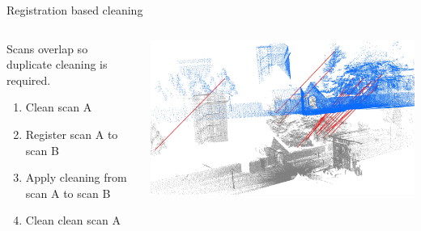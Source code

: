 \documentclass{beamer}
\begin{document}
\begin{frame}{Registration based cleaning}

\begin{columns}[T]

\begin{column}{0.5\textwidth}

  Scans overlap so duplicate cleaning is required.
  \begin{enumerate}
  \item Clean scan A
  \item Register scan A to scan B
  \item Apply cleaning from scan A to scan B
  \item Clean clean scan A
  \end{enumerate}

\end{column}

\begin{column}{0.5\textwidth}

\includegraphics[width=1\textwidth]{pics/registration_outdoor.png}

\end{column}

\end{columns}

\end{frame}
\end{document}
